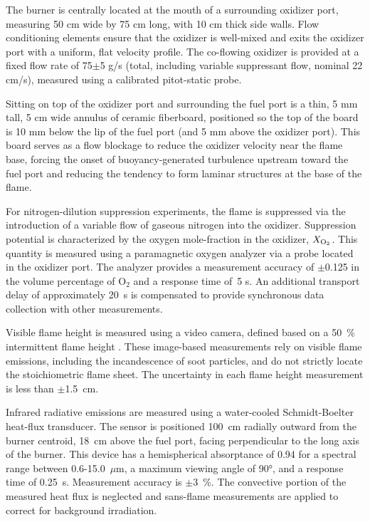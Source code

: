 The burner is centrally located at the mouth of a surrounding oxidizer port, measuring 50 cm wide by 75 cm long, with 10 cm thick side walls. Flow conditioning elements ensure that the oxidizer is well-mixed and exits the oxidizer port with a uniform, flat velocity profile. The co-flowing oxidizer is provided at a fixed flow rate of 75$\pm$5 g/s (total, including variable suppressant flow, nominal 22 cm/s), measured using a calibrated pitot-static probe.

Sitting on top of the oxidizer port and surrounding the fuel port is a thin, 5 mm tall, 5 cm wide annulus of ceramic fiberboard, positioned so the top of the board is 10 mm below the lip of the fuel port (and 5 mm above the oxidizer port). This board serves as a flow blockage to reduce the oxidizer velocity near the flame base, forcing the onset of buoyancy-generated turbulence upstream toward the fuel port and reducing the tendency to form laminar structures at the base of the flame.

For nitrogen-dilution suppression experiments, the flame is suppressed via the introduction of a variable flow of gaseous nitrogen into the oxidizer. Suppression potential is characterized by the oxygen mole-fraction in the oxidizer, $X_{\rm O_2}$. This quantity is measured using a paramagnetic oxygen analyzer via a probe located in the oxidizer port. The analyzer provides a measurement accuracy of $\pm$0.125 in the volume percentage of O$_2$ and a response time of~5 s. An additional transport delay of approximately 20~s is compensated to provide synchronous data collection with other measurements.

Visible flame height is measured using a video camera, defined based on a 50~\% intermittent flame height \cite{White:2015}. These image-based measurements rely on visible flame emissions, including the incandescence of soot particles, and do not strictly locate the stoichiometric flame sheet. The uncertainty in each flame height measurement is less than $\pm$1.5~cm.

Infrared radiative emissions are measured using a water-cooled Schmidt-Boelter heat-flux transducer. The sensor is positioned 100~cm radially outward from the burner centroid, 18~cm above the fuel port, facing perpendicular to the long axis of the burner. This device has a hemispherical absorptance of 0.94 for a spectral range between 0.6-15.0~$\mu$m, a maximum viewing angle of 90\si{\degree}, and a response time of 0.25~s. Measurement accuracy is $\pm$3~\%. The convective portion of the measured heat flux is neglected and sans-flame measurements are applied to correct for background irradiation.

